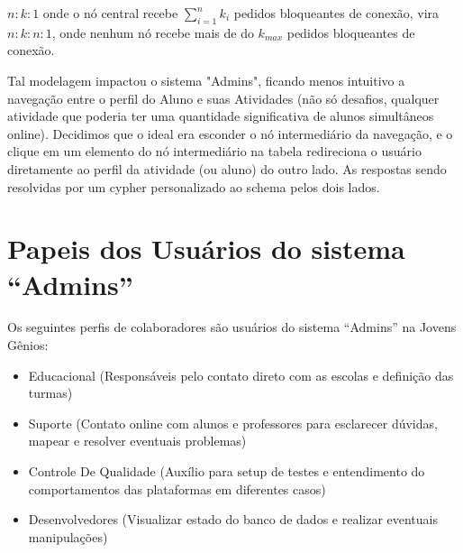 \(n:k:1\) onde o nó central recebe \(\sum_{i=1}^n k_i\) pedidos bloqueantes de conexão, vira \(n:k:n:1\), onde nenhum nó recebe mais de do \(k_{max}\) pedidos bloqueantes de conexão.

Tal modelagem impactou o sistema "Admins", ficando menos intuitivo a navegação entre o perfil do Aluno e suas Atividades (não só desafios, qualquer atividade que poderia ter uma quantidade significativa de alunos simultâneos online). Decidimos que o ideal era esconder o nó intermediário da navegação, e o clique em um elemento do nó intermediário na tabela redireciona o usuário diretamente ao perfil da atividade (ou aluno) do outro lado. As respostas sendo resolvidas por um cypher personalizado ao schema pelos dois lados.

\section{Papeis dos Usuários do sistema ``Admins''}

Os seguintes perfis de colaboradores são usuários do sistema ``Admins'' na Jovens Gênios:

\begin{itemize}
    \item Educacional (Responsáveis pelo contato direto com as escolas e definição das turmas)
    \item Suporte (Contato online com alunos e professores para esclarecer dúvidas, mapear e resolver eventuais problemas)
    \item Controle De Qualidade (Auxílio para setup de testes e entendimento do comportamentos das plataformas em diferentes casos)
    \item Desenvolvedores (Visualizar estado do banco de dados e realizar eventuais manipulações)
\end{itemize}
